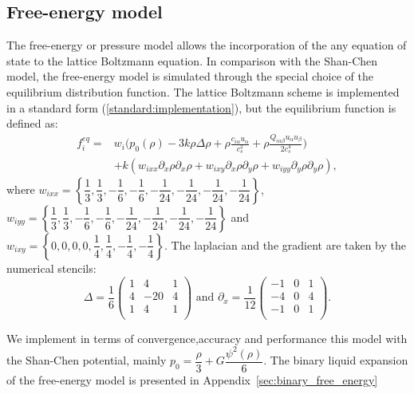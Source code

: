 \documentclass[mathpazo]{cicp}
\begin{document}
\subsection{Free-energy model}
The free-energy or pressure model \cite{swift} allows the incorporation of the
any equation of state to the lattice Boltzmann equation. In comparison with the
Shan-Chen model, the free-energy model is simulated through the special choice
of the equilibrium distribution function. The lattice Boltzmann scheme is
implemented in a standard form (\ref{standard:implementation}), but the
equilibrium function is defined as: \begin{equation}
\begin{aligned}
f_i^{eq}=&w_i \biggl(p_0(\rho)-3 k\rho\Delta\rho+\rho \frac{c_{i\alpha}u_{\alpha}}{c_s^2}+\rho \frac{Q_{i\alpha\beta}u_{\alpha}u_{\beta}}{2 c_s^4}\biggr)\\
&+k (w_{ixx} \partial_x \rho \partial_x \rho + w_{ixy} \partial_x \rho \partial_y \rho + w_{iyy} \partial_y \rho \partial_y \rho),
\end{aligned}
\end{equation}
where $w_{ixx}=\left\{\dfrac{1}{3},\dfrac{1}{3},-\dfrac{1}{6},-\dfrac{1}{6},-\dfrac{1}{24},-\dfrac{1}{24},-\dfrac{1}{24},-\dfrac{1}{24}\right\}$,
$w_{iyy}=\left\{\dfrac{1}{3},\dfrac{1}{3},-\dfrac{1}{6},-\dfrac{1}{6},-\dfrac{1}{24},-\dfrac{1}{24},-\dfrac{1}{24},-\dfrac{1}{24}\right\}$
and $w_{ixy}=\left\{0,0,0,0,\dfrac{1}{4},\dfrac{1}{4},-\dfrac{1}{4},-\dfrac{1}{4}\right\}$. The laplacian and the gradient are taken by the numerical stencils:
\begin{equation}
\Delta=\frac{1}{6}
\begin{pmatrix}
1&4&1\\
4&-20&4\\
1&4&1\\
\end{pmatrix}\text{ and }
\partial_x=\frac{1}{12}
\begin{pmatrix}
-1&0&1\\
-4&0&4\\
-1&0&1\\
\end{pmatrix}.
\end{equation}

We implement in terms of convergence,accuracy and performance this model with the Shan-Chen potential, mainly $p_0=\dfrac{\rho}{3}+G\dfrac{\psi^2(\rho)}{6}$. The binary liquid expansion of the free-energy model is presented in Appendix~\ref{sec:binary_free_energy}
\end{document}
